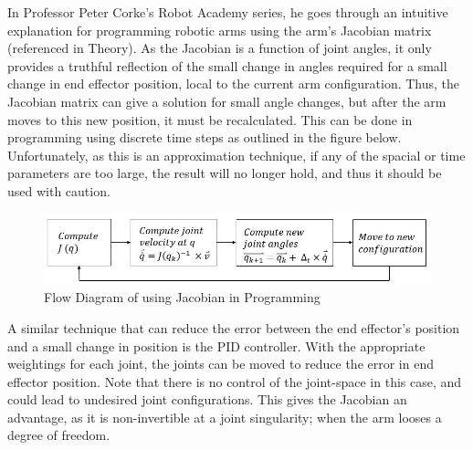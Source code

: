 \documentclass[12pt,openany,a4paper]{book}
\begin{document}
In Professor Peter Corke's Robot Academy series, he goes through an intuitive explanation for programming robotic arms using the arm's Jacobian matrix (referenced in Theory). As the Jacobian is a function of joint angles, it only provides a truthful reflection of the small change in angles required for a small change in end effector position, local to the current arm configuration. Thus, the Jacobian matrix can give a solution for small angle changes, but after the arm moves to this new position, it must be recalculated. This can be done in programming using discrete time steps as outlined in the figure below. Unfortunately, as this is an approximation technique, if any of the spacial or time parameters are too large, the result will no longer hold, and thus it should be used with caution.

\begin{center}
\begin{figure}[htb]
  \includegraphics[width=\linewidth]{jacobian_programming.jpg}
\caption{Flow Diagram of using Jacobian in Programming}
\end{figure}
\end{center}

A similar technique that can reduce the error between the end effector's position and a small change in position is the PID controller. With the appropriate weightings for each joint, the joints can be moved to reduce the error in end effector position. Note that there is no control of the joint-space in this case, and could lead to undesired joint configurations. This gives the Jacobian an advantage, as it is non-invertible at a joint singularity; when the arm looses a degree of freedom.
\end{document}
